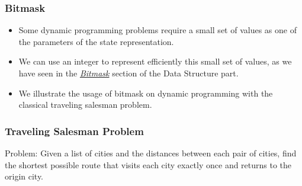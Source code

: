 \documentclass{beamer}
\begin{document}
\begin{frame}%
\frametitle{Bitmask}

\begin{itemize}

\item Some dynamic programming problems require a small set of values as one of the parameters of the state representation.

\vspace{0.5cm}

\item<2-> We can use an integer to represent efficiently this small set of values, as we have seen in the \hyperlink{sec:datastructure_bitmask}{\emph{Bitmask}} section of
the Data Structure part.

\vspace{0.5cm}

\item<3-> We illustrate the usage of bitmask on dynamic programming  with the classical traveling salesman problem.

\end{itemize}

\end{frame}

\begin{frame}%
\frametitle{Traveling Salesman Problem}

\begin{mdframed}[style=exampledefault]
Problem: Given a list of cities and the distances between each pair of cities,
find the shortest possible route that visits each city exactly once and returns to the origin city.
\end{mdframed}

\vspace{0.3cm}


\end{frame}
\end{document}

